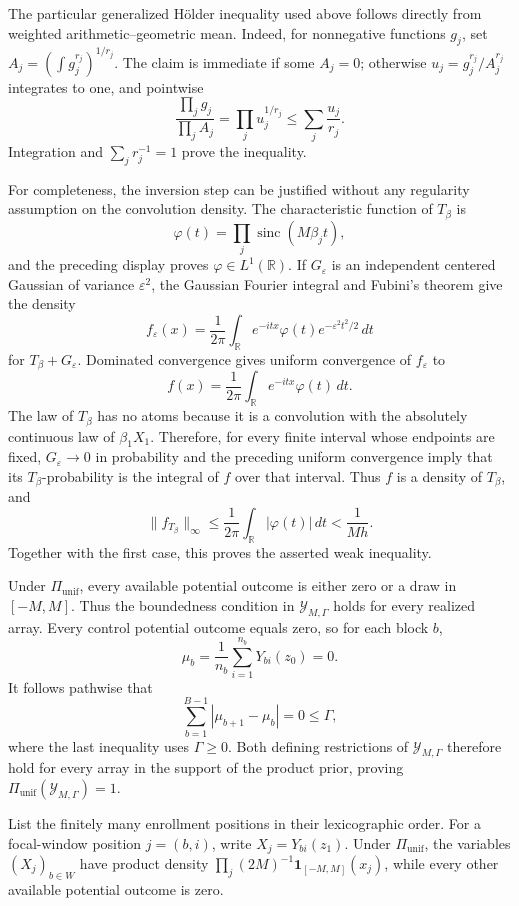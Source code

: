 The particular generalized H\"older inequality used above follows directly from weighted arithmetic--geometric mean.  Indeed, for nonnegative functions \(g_j\), set \(A_j=(\int g_j^{r_j})^{1/r_j}\).  The claim is immediate if some \(A_j=0\); otherwise \(u_j=g_j^{r_j}/A_j^{r_j}\) integrates to one, and pointwise
\[
 \frac{\prod_jg_j}{\prod_jA_j}
 =\prod_ju_j^{1/r_j}
 \le\sum_j\frac{u_j}{r_j}.
\]
Integration and \(\sum_jr_j^{-1}=1\) prove the inequality.

For completeness, the inversion step can be justified without any regularity assumption on the convolution density.  The characteristic function of \(T_\beta\) is
\[
 \varphi(t)=\prod_j\operatorname{sinc}(M\beta_jt),
\]
and the preceding display proves \(\varphi\in L^1(\mathbb R)\).  If \(G_\varepsilon\) is an independent centered Gaussian of variance \(\varepsilon^2\), the Gaussian Fourier integral and Fubini's theorem give the density
\[
 f_\varepsilon(x)=\frac1{2\pi}\int_{\mathbb R}
 e^{-itx}\varphi(t)e^{-\varepsilon^2t^2/2}\,dt
\]
for \(T_\beta+G_\varepsilon\).  Dominated convergence gives uniform convergence of \(f_\varepsilon\) to
\[
 f(x)=\frac1{2\pi}\int_{\mathbb R}e^{-itx}\varphi(t)\,dt.
\]
The law of \(T_\beta\) has no atoms because it is a convolution with the absolutely continuous law of \(\beta_1X_1\).  Therefore, for every finite interval whose endpoints are fixed, \(G_\varepsilon\to0\) in probability and the preceding uniform convergence imply that its \(T_\beta\)-probability is the integral of \(f\) over that interval.  Thus \(f\) is a density of \(T_\beta\), and
\[
 \|f_{T_\beta}\|_\infty
 \le \frac1{2\pi}\int_{\mathbb R}|\varphi(t)|\,dt
 <\frac1{Mh}.
\]
Together with the first case, this proves the asserted weak inequality.

Under \(\Pi_{\mathrm{unif}}\), every available potential outcome is either zero or a draw in \([-M,M]\).  Thus the boundedness condition in \(\mathcal Y_{M,\Gamma}\) holds for every realized array.  Every control potential outcome equals zero, so for each block \(b\),
\[
 \mu_b=\frac1{n_b}\sum_{i=1}^{n_b}Y_{bi}(z_0)=0.
\]
It follows pathwise that
\[
 \sum_{b=1}^{B-1}|\mu_{b+1}-\mu_b|=0\le\Gamma,
\]
where the last inequality uses \(\Gamma\ge0\).  Both defining restrictions of \(\mathcal Y_{M,\Gamma}\) therefore hold for every array in the support of the product prior, proving \(\Pi_{\mathrm{unif}}(\mathcal Y_{M,\Gamma})=1\).

List the finitely many enrollment positions in their lexicographic order.  For a focal-window position \(j=(b,i)\), write \(X_j=Y_{bi}(z_1)\).  Under \(\Pi_{\mathrm{unif}}\), the variables \((X_j)_{b\in W}\) have product density \(\prod_j(2M)^{-1}\mathbf 1_{[-M,M]}(x_j)\), while every other available potential outcome is zero.

